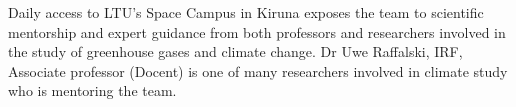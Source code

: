 Daily access to LTU's Space Campus in Kiruna exposes the team to scientific mentorship and expert guidance from both professors and researchers involved in the study of greenhouse gases and climate change. Dr Uwe Raffalski, IRF, Associate professor (Docent) is one of many researchers involved in climate study who is mentoring the team.